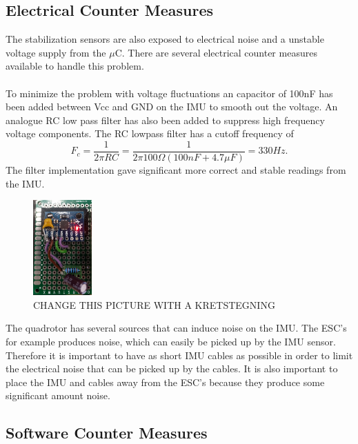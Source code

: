 \subsection{Electrical Counter Measures}
The stabilization sensors are also exposed to electrical noise and a unstable voltage supply from the $\mu$C. There are several electrical counter measures available to handle this problem.           
\\ \\                   
To minimize the problem with voltage fluctuations an capacitor of 100nF has been added between Vcc and GND on the IMU to smooth out the voltage. An analogue RC low pass filter has also been added to suppress high frequency voltage components. The RC lowpass filter has a cutoff frequency of
\begin{equation}
    F_c = \frac{1}{2\pi RC} = \frac{1}{2\pi 100\Omega (100nF + 4.7\mu F)} = 330 Hz. 
\end{equation}
The filter implementation gave significant more correct and stable readings from the IMU. 
\begin{figure}[H]
    \centering
         \includegraphics[width = 0.2\textwidth]{NoisePictures/Sensor.jpg}
      \caption{CHANGE THIS PICTURE WITH A KRETSTEGNING}
    \label{fig:PIKK}
\end{figure} 
The quadrotor has several sources that can induce noise on the IMU. The ESC's for example produces noise, which can easily be picked up by the IMU sensor. Therefore it is important to have as short IMU cables as possible in order to limit the electrical noise that can be picked up by the cables. It is also important to place the IMU and cables away from the ESC's because they produce some significant amount noise.
\subsection{Software Counter Measures}

